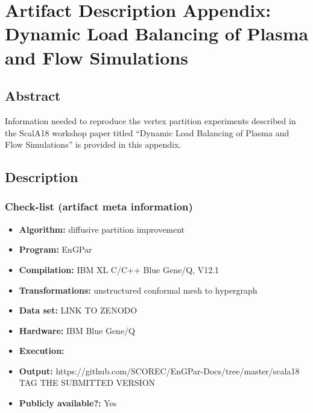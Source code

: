 

\appendices

\section{Artifact Description Appendix: 
Dynamic Load Balancing of Plasma and Flow Simulations}

\subsection{Abstract}

Information needed to reproduce the vertex partition experiments described in
the ScalA18 workshop paper titled ``Dynamic Load Balancing of Plasma and Flow
Simulations'' is provided in this appendix.

\subsection{Description}

\subsubsection{Check-list (artifact meta information)}

{\small
\begin{itemize}
  \item {\bf Algorithm: } diffusive partition improvement
  \item {\bf Program: } EnGPar
  \item {\bf Compilation: } IBM XL C/C++ Blue Gene/Q, V12.1
  \item {\bf Transformations: } unstructured conformal mesh to hypergraph
  \item {\bf Data set: } {\color{red} LINK TO ZENODO}
  \item {\bf Hardware: } IBM Blue Gene/Q
  \item {\bf Execution: }
  \item {\bf Output: } https://github.com/SCOREC/EnGPar-Docs/tree/master/scala18
    {\color{red} TAG THE SUBMITTED VERSION}
  \item {\bf Publicly available?: } Yes
\end{itemize}
}

